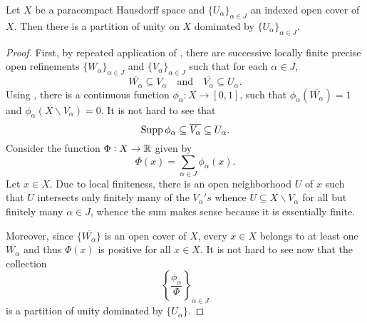 \begin{theorem}
    Let $X$ be a paracompact Hausdorff space and $\{U_\alpha\}_{\alpha\in J}$ an indexed open cover of $X$. Then there is a partition of unity on $X$ dominated by $\{U_\alpha\}_{\alpha\in J}$.
\end{theorem}
\begin{proof}
    First, by repeated application of , there are successive locally finite precise open refinements $\{W_\alpha\}_{\alpha\in J}$ and $\{V_\alpha\}_{\alpha\in J}$ such that for each $\alpha\in J$,
    \begin{equation*}
        \overline{W_\alpha}\subseteq V_\alpha\quad\text{and}\quad\overline{V_\alpha}\subseteq U_\alpha.
    \end{equation*}
    Using , there is a continuous function $\phi_\alpha: X\to[0,1]$, such that $\phi_\alpha(\overline{W_\alpha}) = 1$ and $\phi_\alpha(X\backslash V_\alpha) = 0$. It is not hard to see that 
    \begin{equation*}
        \operatorname{Supp}\phi_\alpha\subseteq\overline{V_\alpha}\subseteq U_\alpha.
    \end{equation*}
    Consider the function $\Phi: X\to\mathbb{R}$ given by 
    \begin{equation*}
        \Phi(x) = \sum_{\alpha\in J}\phi_\alpha(x).
    \end{equation*}
    Let $x\in X$. Due to local finiteness, there is an open neighborhood $U$ of $x$ such that $U$ intersects only finitely many of the $V_\alpha's$ whence $U\subseteq X\backslash V_\alpha$ for all but finitely many $\alpha\in J$, whence the sum makes sense because it is essentially finite.

    Moreover, since $\{\overline{W_\alpha}\}$ is an open cover of $X$, every $x\in X$ belongs to at least one $\overline{W_\alpha}$ and thus $\Phi(x)$ is positive for all $x\in X$. It is not hard to see now that the collection 
    \begin{equation*}
        \left\{\frac{\phi_\alpha}{\Phi}\right\}_{\alpha\in J}
    \end{equation*}
    is a partition of unity dominated by $\{U_\alpha\}$.
\end{proof}
